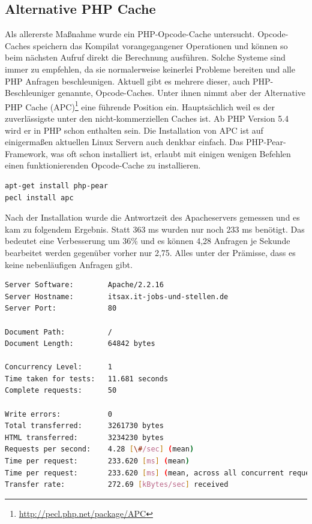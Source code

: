 \subsection{Alternative PHP Cache} Als allererste Maßnahme wurde ein PHP-Opcode-Cache untersucht. Opcode-Caches speichern das Kompilat vorangegangener Operationen und können so beim nächsten Aufruf direkt die Berechnung ausf\"uhren. Solche Systeme sind immer zu empfehlen, da sie normalerweise keinerlei Probleme bereiten und alle PHP Anfragen beschleunigen. Aktuell gibt es mehrere dieser, auch PHP-Beschleuniger genannte, Opcode-Caches. Unter ihnen nimmt aber der Alternative PHP Cache (APC)\footnote{\url{http://pecl.php.net/package/APC}} eine führende Position ein. Hauptsächlich weil es der zuverlässigste unter den nicht-kommerziellen Caches ist. Ab PHP Version 5.4 wird er in PHP schon enthalten sein.
Die Installation von APC ist auf einigermaßen aktuellen Linux Servern auch denkbar einfach. Das PHP-Pear-Framework, was oft schon installiert ist, erlaubt mit einigen wenigen Befehlen einen funktionierenden Opcode-Cache zu installieren. 
\begin{lstlisting}[language=bash,label=Installation von APC,caption=Installation von APC]
apt-get install php-pear
pecl install apc
\end{lstlisting}
Nach der Installation wurde die Antwortzeit des Apacheservers gemessen und es kam zu folgendem Ergebnis. Statt 363 ms wurden nur noch 233 ms benötigt. Das bedeutet eine Verbesserung um 36\% und es können 4,28 Anfragen je Sekunde bearbeitet werden gegenüber vorher nur 2,75. Alles unter der Prämisse, dass es keine nebenl\"aufigen Anfragen gibt.

\begin{minipage}[t]{1\textwidth} 
\begin{lstlisting}[language=bash,label=APC gemessen mit ab,caption=APC gemessen mit ab]
Server Software:        Apache/2.2.16
Server Hostname:        itsax.it-jobs-und-stellen.de
Server Port:            80

Document Path:          /
Document Length:        64842 bytes

Concurrency Level:      1
Time taken for tests:   11.681 seconds
Complete requests:      50

Write errors:           0
Total transferred:      3261730 bytes
HTML transferred:       3234230 bytes
Requests per second:    4.28 [\#/sec] (mean)
Time per request:       233.620 [ms] (mean)
Time per request:       233.620 [ms] (mean, across all concurrent requests)
Transfer rate:          272.69 [kBytes/sec] received
\end{lstlisting}
\end{minipage}

